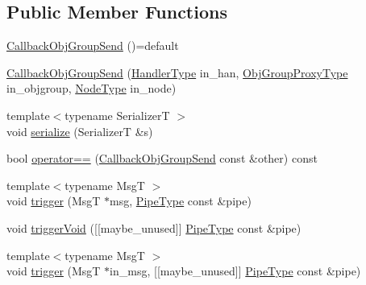 \subsection*{Public Member Functions}
\begin{DoxyCompactItemize}
\item 
\hyperlink{structvt_1_1pipe_1_1callback_1_1_callback_obj_group_send_ad23abb2b17572d769a347984efe6441b}{Callback\+Obj\+Group\+Send} ()=default
\item 
\hyperlink{structvt_1_1pipe_1_1callback_1_1_callback_obj_group_send_a4ddc589bf578055a3e96b62be954c12e}{Callback\+Obj\+Group\+Send} (\hyperlink{namespacevt_af64846b57dfcaf104da3ef6967917573}{Handler\+Type} in\+\_\+han, \hyperlink{namespacevt_ad7cae989df485fccca57f0792a880a8e}{Obj\+Group\+Proxy\+Type} in\+\_\+objgroup, \hyperlink{namespacevt_a866da9d0efc19c0a1ce79e9e492f47e2}{Node\+Type} in\+\_\+node)
\item 
{\footnotesize template$<$typename SerializerT $>$ }\\void \hyperlink{structvt_1_1pipe_1_1callback_1_1_callback_obj_group_send_a703ca9f56b2d1927b098a5889326a758}{serialize} (SerializerT \&s)
\item 
bool \hyperlink{structvt_1_1pipe_1_1callback_1_1_callback_obj_group_send_a32e50947e4799023db35e63f80575c63}{operator==} (\hyperlink{structvt_1_1pipe_1_1callback_1_1_callback_obj_group_send}{Callback\+Obj\+Group\+Send} const \&other) const
\item 
{\footnotesize template$<$typename MsgT $>$ }\\void \hyperlink{structvt_1_1pipe_1_1callback_1_1_callback_obj_group_send_a40f0cd87224b51fdbfffacfe80bdde35}{trigger} (MsgT $\ast$msg, \hyperlink{namespacevt_ac9852acda74d1896f48f406cd72c7bd3}{Pipe\+Type} const \&pipe)
\item 
void \hyperlink{structvt_1_1pipe_1_1callback_1_1_callback_obj_group_send_a665f6d1f03d6b311842caf3683e5b108}{trigger\+Void} (\mbox{[}\mbox{[}maybe\+\_\+unused\mbox{]}\mbox{]} \hyperlink{namespacevt_ac9852acda74d1896f48f406cd72c7bd3}{Pipe\+Type} const \&pipe)
\item 
{\footnotesize template$<$typename MsgT $>$ }\\void \hyperlink{structvt_1_1pipe_1_1callback_1_1_callback_obj_group_send_a1de8bd88e4fa7d190dc4524d062ec1db}{trigger} (MsgT $\ast$in\+\_\+msg, \mbox{[}\mbox{[}maybe\+\_\+unused\mbox{]}\mbox{]} \hyperlink{namespacevt_ac9852acda74d1896f48f406cd72c7bd3}{Pipe\+Type} const \&pipe)
\end{DoxyCompactItemize}

